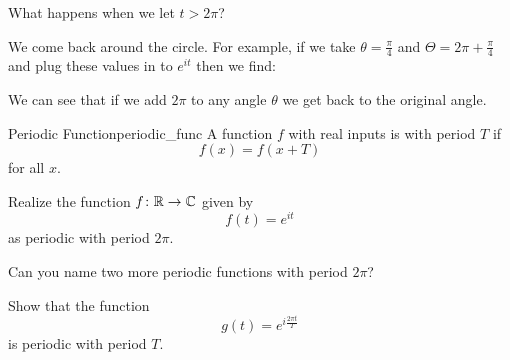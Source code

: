         \begin{question}
            What happens when we let $t>2\pi$? 
        \end{question}
        
        \begin{answer}
            We come back around the circle. For example, if we take $\theta=\frac{\pi}{4}$ and $\Theta=2\pi + \frac{\pi}{4}$ and plug these values in to $e^{it}$ then we find:
            \begin{center}
        \end{center}
        We can see that if we add $2\pi$ to any angle $\theta$ we get back to the original angle.  
        \end{answer}
        
        \begin{df}{Periodic Function}{periodic_func}
            A function $f$ with real inputs is  with period $T$ if 
            \[
            f(x)=f(x+T)
            \]
            for all $x$.
        \end{df}
        
        \begin{exercise}
        Realize the function $f\colon \mathbb{R} \to \mathbb{C}$ given by
        \[
        f(t)=e^{it}
        \]
        as periodic with period $2\pi$.
        \end{exercise}
        
        \begin{exercise}
        Can you name two more periodic functions with period $2\pi$? 
        \end{exercise}
        
        \begin{exercise}
        Show that the function 
        \[
        g(t)=e^{i\frac{2\pi t}{T}}
        \]
        is periodic with period $T$.
        \end{exercise}
        
